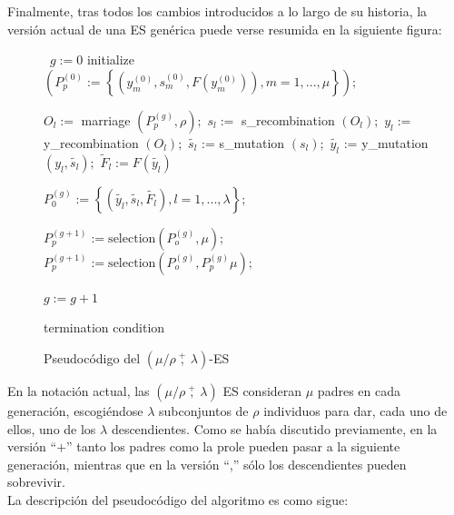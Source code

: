 \documentclass[12pt]{article} \usepackage[utf8]{inputenc}
\begin{document}
Finalmente, tras todos los cambios introducidos a lo largo de su
historia, la versión actual de una ES genérica puede verse resumida en la
siguiente figura:

\begin{figure}[H]
  \begin{algorithm}[H]
    \begin{algorithmic}[1]
      \label{ES-alg}
      \,
      \State $g := 0$
      \State initialize $\left( P_p^{(0)} := \left\{ \left(y_m^{(0)},
            s_m^{(0)}, F(y_m^{(0)}) \right), m = 1, ..., \mu \right\}
      \right);$
      \Repeat

      \State $O_l :=$ marriage $\left( P_p^{(g)}, \rho \right);$
      \State $s_l :=$ s\_recombination $\left( O_l \right);$
      \State $y_l :=$ y\_recombination $\left( O_l \right);$
      \State $\tilde{s_l}$ := s\_mutation $\left( s_l \right);$
      \State $\tilde{y_l}$ := y\_mutation $\left( y_l, \tilde{s_l} \right);$
      \State $\tilde{F}_l := F(\tilde{y_l})$
      \EndFor

      \State $P_0^{(g)} := \left\{ \left( \tilde{y_l}, \tilde{s_l},
          \tilde{F_l} \right), l = 1, ..., \lambda \right\};$

      \State $P_p^{(g+1)} := \mathrm{selection} \left( P_o^{(g)}, \mu \right);$
      \State $P_p^{(g+1)} := \mathrm{selection} \left( P_o^{(g)}, P_p^{(g)} \mu \right);$
      \EndIf

      \State $g := g + 1$

      \Until termination condition
      \EndProcedure
    \end{algorithmic}
  \end{algorithm}
  \caption{Pseudocódigo del $\left( \mu / \rho \ \overset{+}{,} \ \lambda \right)$-ES \cite{beyer-es}}
\end{figure}

En la notación actual, las $(\mu / \rho \ \overset{+}{,} \ \lambda)$ ES consideran $\mu$ padres en cada generación, escogiéndose $\lambda$ subconjuntos de $\rho$ individuos para dar, cada uno de ellos, uno de los $\lambda$ descendientes. Como se había discutido previamente, en la versión ``$+$'' tanto los padres como la prole pueden pasar a la siguiente generación, mientras que en la versión ``,'' sólo los descendientes pueden sobrevivir. \\

La descripción del pseudocódigo del algoritmo es como sigue:
\end{document}
